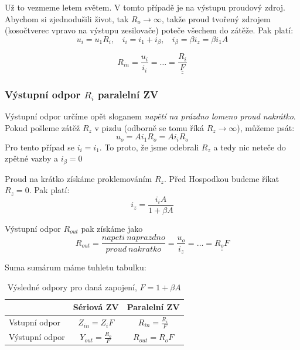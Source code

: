 \documentclass[a4paper,12pt]{article}   %
\begin{document}
Už to vezmeme letem světem. V tomto případě je na výstupu proudový zdroj. Abychom si zjednodušili život, tak $R_o \rightarrow \infty$, takže proud tvořený zdrojem (kosočtverec vpravo na výstupu zesilovače) poteče všechem do zátěže. Pak platí: 
\begin{equation}
    u_i = u_\text{1} R_i,~~~~i_i=i_\text{1} + i_\beta,~~~~ i_\beta = \beta i_z = \beta i_1 A
\end{equation}

\begin{equation}
    R_{in} = \frac{u_i}{i_i} = \dots = \underline{\underline{\frac{R_i}{F}}}
\end{equation}

\subsubsection{Výstupní odpor $R_i$ paralelní ZV}
Výstupní odpor určíme opět sloganem \textit{napětí na prázdno lomeno proud nakrátko}.
Pokud pošleme zátěž $R_z$ v pizdu (odborně se tomu říká $R_z \rightarrow \infty$), můžeme psát:
\begin{equation*}
    u_o = Ai_\text{1}R_o = Ai_iR_o
\end{equation*}
Pro tento případ se $i_i = i_\text{1}$. To proto, že jsme odebrali $R_z$ a tedy nic neteče do zpětné vazby a $i_\beta = 0$

Proud na krátko získáme proklemováním $R_z$. Před Hospodkou budeme říkat $R_z = 0$. Pak platí:
\begin{equation*}
    i_z = \frac{i_i A}{1+\beta A}
\end{equation*}

Výstupní odpor $R_{out}$ pak získáme jako
\begin{equation}
    R_{out} = \frac{napeti~naprazdno}{proud~nakratko} = \frac{u_o}{i_z} = \dots = \underline{\underline{R_o F}}
\end{equation}

Suma sumárum máme tuhletu tabulku:
\begin{table}[h!]
    \centering
    \begin{tabular}{|l|c|c|}
        \hline
        & Sériová ZV & Paralelní ZV\\\hline\hline
        \rule{0pt}{2.5ex}Vstupní odpor & $Z_{in} = Z_i F$ & $R_{in} = \frac{R_i}{F}$\\[.7ex]\hline
        \rule{0pt}{2.5ex}Výstupní odpor & $Y_{out} = \frac{R_o}{F}$ & $R_{out} = R_o F$\\[.7ex]\hline
    \end{tabular}        
    \caption{Výsledné odpory pro daná zapojení, $F=1+\beta A$}
\end{table}%
\end{document}
